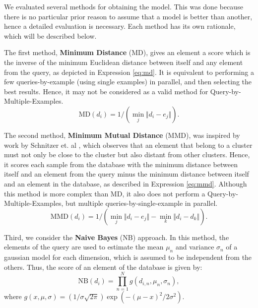 \documentclass{article}
\begin{document}
We evaluated several methods for obtaining the model. This was done
because there is no particular prior reason to assume that a model is
better than another, hence a detailed evaluation is necessary. Each
method has its own rationale, which will be described below.

The first method, \textbf{Minimum Distance} (MD), gives an element a score
which is the inverse of the minimum Euclidean distance between itself
and any element from the query, as depicted in Expression
\ref{eq:md}. It is
equivalent to performing a few queries-by-example (using single
examples) in parallel, and then selecting the best results. Hence, it
may not be considered as a valid method for Query-by-Multiple-Examples.
\begin{equation}
{\mbox{MD}}(d_i) = 1/(\min_j \Vert d_i - e_j \Vert).
\label{eq:md}
\end{equation}

The second method, \textbf{Minimum Mutual Distance} (MMD), was
inspired by work by Schnitzer et. al \cite{Schnitzer2011}, which
observes that an element that belong to a cluster must not only be close
to the cluster but also distant from other clusters. Hence, it scores
each sample from the database with the minimum distance between itself
and an element from the query minus the minimum distance between
itself and an element in the database, as described in Expression
\ref{eq:mmd}. Although this method is more complex than MD, it also
does not perform a Query-by-Multiple-Examples, but multiple queries-by-single-example
in parallel.
\begin{equation}
{\mbox{MMD}}(d_i) = 1/(\min_{j} \Vert d_i - e_j \Vert - \min_{k} \Vert d_i - d_k \Vert).
\label{eq:mmd}
\end{equation}

Third, we consider the \textbf{Naive Bayes} (NB) approach. In this
method, the elements of the 
query are used to estimate the mean $\mu_n$ and variance $\sigma_n$ of
a gaussian model for each dimension, which is assumed to be
independent from the others. Thus, the score of an element of the database is given
by:
\begin{equation}
\mbox{NB}(d_i) = \prod_{n=1}^N g(d_{i,n}, \mu_n, \sigma_n),
\end{equation}
where $g(x, \mu, \sigma) = (1/\sigma \sqrt{2 \pi}) \exp(-(\mu - x)^2 / 2\sigma ^2)$.

\end{document}
